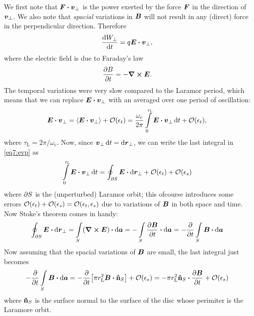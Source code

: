\documentclass[11pt,a4paper, 
swedish, english %
]{article}
\newcommand{\wc}{\ensuremath{\omega_{\text{c}}}}
\newcommand{\rL}{\ensuremath{r_{\text{L}}}}
\begin{document}
We first note that $\vb*F\vdot\vb*v_\perp$ is the power exerted by the
force $\vb*F$ in the direction of $\vb*v_\perp$. We also note that
\emph{spacial} variations in $\vb*B$ will not result in any (direct)
force in the perpendicular direction. Therefore
\begin{equation}\label{eq7:Wp1}
\dv{W_\perp}{t} = q\vb*E\vdot\vb*v_\perp,
\end{equation}
where the electric field is due to Faraday's law
\begin{equation}\label{eq7:Faraday}
\pdv{B}{t} = -\curl\vb*E.
\end{equation}
The temporal variations were very slow compared to the Laramor period,
which means that we can replace $\vb*E\vdot\vb*v_\perp$ with an
averaged over one period of oscillation:
\begin{equation}\label{eq7:evp}
\vb*E\vdot\vb*v_\perp
=\ev{\vb*E\vdot\vb*v_\perp}+\order{\epsilon_t}
=\frac{\wc}{2\pi}\int_0^{\tau_\text{L}}\vb*E\vdot\vb*v_\perp\id{t}
+\order{\epsilon_t},
\end{equation}
where $\tau_\text{L}=2\pi/\wc$.
Now, since $\vb*v_\perp\,\mathrm{d}{t}=\mathrm{d}\vb*r_\perp$, we can write the last
integral in \eqref{eq7:evp} as
\begin{equation}
\int_0^{\tau_\text{L}}\vb*E\vdot\vb*v_\perp\id{t}
=\oint_{\pd S}\vb*E\vdot\rd\vb*r_\perp +\order{\epsilon_t}+\order{\epsilon_s}
\end{equation}
where $\partial S$ is the (unperturbed) Laramor orbit; this ofcourse
introduces some errors 
$\order{\epsilon_t}+\order{\epsilon_s}=\order{\epsilon_t, \epsilon_s}$
due to variations of $\vb*B$ in both space and time. Now Stoke's
theorem comes in handy:
\begin{equation}
\oint_{\pd S}\vb*E\vdot\rd\vb*r_\perp 
=\int_{S}(\curl\vb*E)\vdot\rd\vb*a 
=-\int_{S}\pdv{\vb*B}{t}\vdot\rd\vb*a 
=-\pdv{t}\int_{S}\vb*B\vdot\rd\vb*a 
\end{equation}
Now assuming that the spacial variations of $\vb*B$ are small, the
last integral just becomes
\begin{equation}
-\pdv{t}\int_{S}\vb*B\vdot\rd\vb*a 
=-\pdv{t}\qty[\pi\rL^2 \vb*B\vdot\vu{n}_S]+\order{\epsilon_s}
=-\pi\rL^2 \vu{n}_S\vdot\pdv{\vb*B}{t}+\order{\epsilon_s}
\end{equation}
where $\vu{n}_S$ is the surface normal to the surface of the disc
whose perimiter is the Laramore orbit. 
\end{document}
